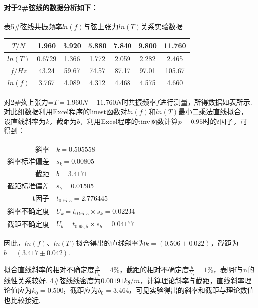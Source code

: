 \documentclass[UTF8]{ctexart}
\begin{document}
\paragraph{对于2\#弦线的数据分析如下：}
\begin{center}
{\kaishu 表5\#弦线共振频率$ln(f)$与弦上张力$ln(T)$关系实验数据}
\begin{tabular}{|c|c|c|c|c|c|c|}
\hline
	$T/N$&1.960&3.920&5.880&7.840&9.800&11.760\\
\hline
	$ln(T)$&0.6729&1.366&1.772&2.059&2.282&2.465\\
\hline
	$f/Hz$&43.24&59.67&74.57&87.17&97.01&105.67\\
\hline
	$ln(f)$&3.767&4.089&4.312&4.468&4.575&4.660\\
\hline
\end{tabular}
\end{center}
\par 对2\#弦上张力=${T} = 1.960N - 11.760N$时共振频率$f$进行测量，所得数据如表所示. 对此组数据利用Excel程序的linest函数对$ln(f)$和$ln(T)$最小二乘法直线拟合，设直线斜率为$k$，截距为$b$，利用Excel程序的tinv函数计算$p = 0.95$时的$t$因子，可得到：\par
\begin{center}\begin{tabular}{r l}
{斜率}& {$k=0.505558$}\\
{斜率标准偏差}& {$s_k=0.00805$}\\
{截距}&{$b=3.4171$}\\
{截距标准偏差}&{$s_b=0.01505$}\\
{t因子}& {$t_{0.95,5}=2.776445$}\\
{斜率不确定度}& {$U_k=t_{0.95,5}\times s_k = 0.02234$}\\
{截距不确定度}& {$U_b=t_{0.95,5}\times s_b = 0.04177$}
\end{tabular}\end{center}
因此，$ln(f)$、$ln(T)$拟合得出的直线斜率为$k=(0.506\pm0.022)$，截距为$b=(3.417\pm0.042).$\par
\begin{figure}[H]\centering{}
\end{figure}
拟合直线斜率的相对不确定度$\frac{k}{U_k} = 4\%$，截距的相对不确定度$\frac{b}{U_b} = 1\%$，表明f与n的线性关系较好. 4\#弦线线密度为$0.00191kg/m$，计算理论斜率与截距，直线斜率理论值应为$k_0=0.500$，截距应为$b_0=3.464$，可见实验得出的斜率和截距与理论数值也比较接近.
\end{document}
